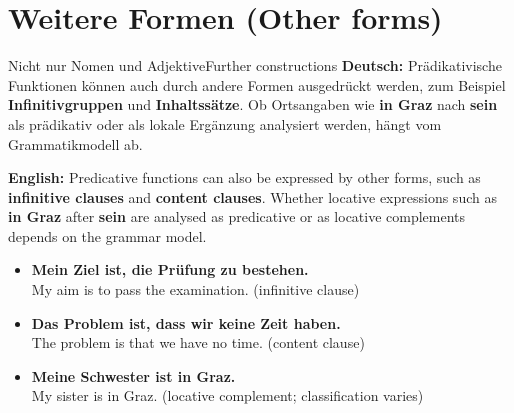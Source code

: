 \documentclass[a4paper,11pt]{article}
\newcommand{\GermanText}[1]{\textbf{Deutsch: }#1\par}
\newcommand{\EnglishText}[1]{{\small\color{SoftGray}\textbf{English: }#1\par}}
\newcommand{\ExampleItem}[2]{\item \textbf{#1}\\{\small\color{SoftGray}#2}}
\begin{document}
\section{Weitere Formen \textnormal{(Other forms)}}
\begin{grammarentry}{Nicht nur Nomen und Adjektive}{Further constructions}
\GermanText{Prädikativische Funktionen können auch durch andere Formen ausgedrückt werden, zum Beispiel \textbf{Infinitivgruppen} und \textbf{Inhaltssätze}. Ob Ortsangaben wie \textbf{in Graz} nach \textbf{sein} als prädikativ oder als lokale Ergänzung analysiert werden, hängt vom Grammatikmodell ab.}
\EnglishText{Predicative functions can also be expressed by other forms, such as \textbf{infinitive clauses} and \textbf{content clauses}. Whether locative expressions such as \textbf{in Graz} after \textbf{sein} are analysed as predicative or as locative complements depends on the grammar model.}
\end{grammarentry}
\begin{exbox}\begin{itemize}
\ExampleItem{Mein Ziel ist, die Prüfung zu bestehen.}{My aim is to pass the examination. (infinitive clause)}
\ExampleItem{Das Problem ist, dass wir keine Zeit haben.}{The problem is that we have no time. (content clause)}
\ExampleItem{Meine Schwester ist in Graz.}{My sister is in Graz. (locative complement; classification varies)}
\end{itemize}\end{exbox}
\end{document}
